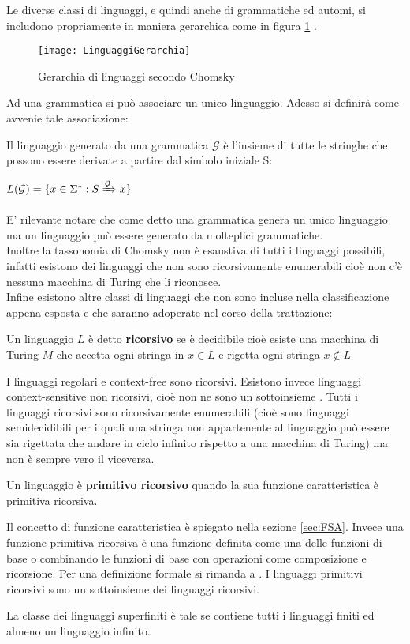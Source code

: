 Le diverse classi di linguaggi, e quindi anche di grammatiche ed automi, si includono propriamente in maniera gerarchica come in figura \ref{fig:linger} .
\begin{figure}[htp]
	\centering
	\texttt{[image: LinguaggiGerarchia]}
	\caption[Gerarchia di linguaggi]{Gerarchia di linguaggi secondo Chomsky}
   \label{fig:linger}
\end{figure}
Ad una grammatica si può associare un unico linguaggio. Adesso si definirà come avvenie tale associazione:
\begin{definizione*}
Il linguaggio generato da una grammatica $\mathcal{G}$ è l'insieme di tutte le stringhe che possono essere derivate a partire dal simbolo iniziale S:\\

\centerline{$L(\mathcal{G}) = \{x \in \Sigma^{*} :S\xRightarrow[]{\mathcal{G}} x\}$}
\end{definizione*}
E' rilevante notare che come detto una grammatica genera un unico linguaggio ma un linguaggio può essere generato da molteplici grammatiche.\\
Inoltre la tassonomia di Chomsky non è esaustiva di tutti i linguaggi possibili, infatti esistono dei linguaggi che non sono ricorsivamente enumerabili cioè non c'è nessuna macchina di Turing che li riconosce.\\
Infine esistono altre classi di linguaggi che non sono incluse nella classificazione appena esposta e che saranno adoperate nel corso della trattazione:
\begin{definizione*} Un linguaggio $L$ è detto \textbf{ricorsivo} se è decidibile cioè esiste una macchina di Turing $M$ che accetta ogni stringa in $x \in L$ e rigetta ogni stringa $x \not\in L$
\end{definizione*}
I linguaggi regolari e context-free sono ricorsivi. Esistono invece linguaggi context-sensitive non ricorsivi, cioè non ne sono un sottoinsieme \cite[p. 124]{Levelt08}. Tutti  i linguaggi ricorsivi sono ricorsivamente enumerabili (cioè sono linguaggi semidecidibili per i quali una stringa non appartenente al linguaggio può essere sia rigettata che andare in ciclo infinito rispetto a una macchina di Turing) ma non è sempre vero il viceversa.
\begin{definizione*}
Un linguaggio è \textbf{primitivo ricorsivo} quando la sua funzione caratteristica è primitiva ricorsiva.
\end{definizione*}
Il concetto di funzione caratteristica è spiegato nella sezione \ref{sec:FSA}. Invece una funzione primitiva ricorsiva è una funzione definita come una delle funzioni di base o combinando le funzioni di base con operazioni come composizione e ricorsione. Per una definizione formale si rimanda a \cite{Rob47}. I linguaggi primitivi ricorsivi sono un sottoinsieme dei linguaggi ricorsivi.
\begin{definizione*}
La classe dei linguaggi superfiniti è tale se contiene tutti i linguaggi finiti ed almeno un linguaggio infinito.
\end{definizione*}
 

